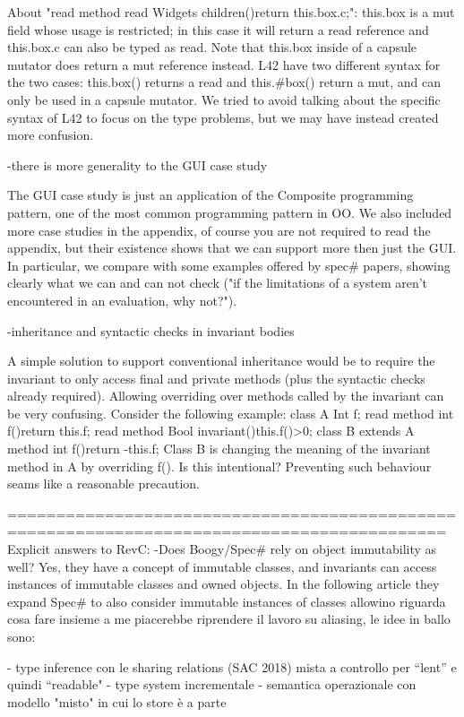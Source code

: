 About "read method read Widgets children(){return this.box.c;}":
this.box is a mut field
whose usage is restricted; in this case it will return a read reference and this.box.c can
also be typed as read.
Note that this.box inside of a capsule mutator does return a mut reference instead.
L42 have two different syntax for the two cases: this.box() returns a read
and this.#box() return a mut, and can only be used in a capsule mutator.
We tried to avoid talking about the specific syntax of L42 to focus on the type problems,
but we may have instead created more confusion.


-there is more generality to the GUI case study

The GUI case study is just an application of the Composite programming pattern,
one of the most common programming pattern in OO.
We also included more case studies in the appendix, of course you are not required
to read the appendix, but their existence shows that we can support more then just the GUI.
 In particular, we compare with some examples offered by spec# papers, showing clearly what
 we can and can not check ("if the limitations of a system aren't encountered in an evaluation, why not?").


-inheritance and syntactic checks in invariant bodies

A simple solution to support conventional inheritance would be to require the invariant to only
access final and private methods (plus the syntactic checks already required).
Allowing overriding over methods called by the invariant can be very confusing.
Consider the following example:
class A{
 Int f;
 read method int f(){return this.f;}
 read method Bool invariant(){this.f()>0;}
 }
class B extends A {
  method int f(){return -this.f;}
  }
Class B is changing the meaning of the invariant method in A by overriding f().
Is this intentional? Preventing such behaviour seams like a reasonable precaution.

===========================================================================================
Explicit answers to RevC:
-Does Boogy/Spec# rely on object immutability as well?
Yes, they have a concept of immutable classes, and invariants can access instances of
immutable classes and owned objects. In the following article they expand Spec# to also
consider immutable instances of classes allowino riguarda cosa fare insieme a me piacerebbe riprendere il lavoro su aliasing, le idee in ballo sono:

- type inference con le sharing relations (SAC 2018) mista a controllo per “lent” e quindi “readable"
- type system incrementale
- semantica operazionale con modello "misto" in cui lo store è a parte


